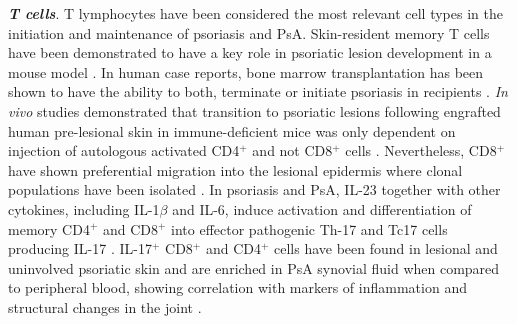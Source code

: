 \textbf{\textit{T cells}}. T lymphocytes have been considered the most relevant cell types in the initiation and maintenance of psoriasis and PsA.  Skin-resident memory T cells have been demonstrated to have a key role in psoriatic lesion development in a mouse model \parencite{Boyman2004}. In human case reports, bone marrow transplantation has been shown to have the ability to both, terminate or initiate psoriasis in recipients \parencite{Gardembas-Pain1990, Eedy1990}. \textit{In vivo} studies demonstrated that transition to psoriatic lesions following engrafted human pre-lesional skin in immune-deficient mice was only dependent on injection of autologous activated CD4$^+$ and not CD8$^+$ cells \parencite{Wrone-Smith1996}. Nevertheless, CD8$^+$ have shown preferential migration into the lesional epidermis where clonal populations have been isolated \parencite{Wrone-Smith1996, Chang1994}. %
In psoriasis and PsA, IL-23 together with other cytokines, including IL-1$\beta$ and IL-6, induce activation and differentiation of memory CD4$^+$ and CD8$^+$ into effector pathogenic Th-17 and Tc17 cells producing IL-17 \parencite{Weaver2007}. IL-17$^+$ CD8$^+$ and CD4$^+$ cells have been found in lesional and uninvolved psoriatic skin and are enriched in PsA synovial fluid when compared to peripheral blood, showing correlation with markers of inflammation and structural changes in the joint \parencite{Menon2014,Ortega2009,Lowes2008, Pene2008}. %




